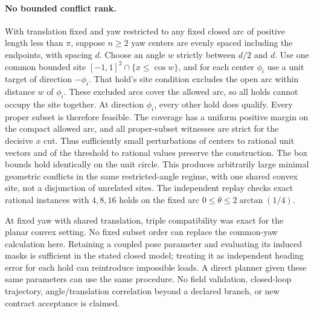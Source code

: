 \documentclass[11pt]{article}
\begin{document}
\paragraph{No bounded conflict rank.}
With translation fixed and yaw restricted to any fixed closed arc of
positive length less than $\pi$, suppose $n\ge2$ yaw centers are evenly
spaced including the endpoints, with spacing $d$. Choose an angle
$w$ strictly between $d/2$ and $d$. Use one common bounded site
$[-1,1]^2\cap\{x\leq\cos w\}$, and for each center $\phi_i$ use a
unit target of direction $-\phi_i$. That hold's site condition excludes
the open arc within distance $w$ of $\phi_i$. These excluded arcs
cover the allowed arc, so all holds cannot occupy the site together.
At direction $\phi_i$, every other hold does qualify. Every proper
subset is therefore feasible. The coverage has a uniform positive
margin on the compact allowed arc, and all proper-subset witnesses are
strict for the decisive $x$ cut. Thus sufficiently small perturbations
of centers to rational unit vectors and of the threshold to rational
values preserve the construction. The box bounds hold identically on
the unit circle. This produces arbitrarily large minimal geometric
conflicts in the same restricted-angle regime, with one shared convex
site, not a disjunction of unrelated sites. The independent replay
checks exact rational instances with $4,8,16$ holds on the fixed arc
$0\le\theta\le 2\arctan(1/4)$.

At fixed yaw with shared translation, triple compatibility was exact
for the planar convex setting. No fixed subset order can replace the
common-yaw calculation here. Retaining a coupled pose parameter and
evaluating its induced masks is sufficient in the stated closed model;
treating it as independent heading error for each hold can reintroduce
impossible loads. A direct planner given these same parameters can use
the same procedure. No field validation, closed-loop trajectory,
angle/translation correlation beyond a declared branch, or new contract
acceptance is claimed.
\end{document}
